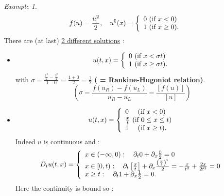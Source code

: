 \documentclass{report}
\theoremstyle{plain}
\theoremstyle{definition}
\theoremstyle{remark}
\newtheorem*{ex}{Example}
\begin{document}
    \begin{ex}
    \begin{equation*}
    	f(u) = \frac{u^2}{2}, \quad u^0(x) = \left\lbrace
    	\begin{array}[]{l}
    		 0 \text{ (if $x<0$)}\\
    		 1 \text{ (if $x \ge 0$)}.
    	\end{array}\right.
    \end{equation*}
    There are (at last) \underline{2 different solutions} :
    \begin{itemize}
        \item \begin{equation*}
    	u(t,x) = \left\lbrace
    	\begin{array}[]{l}
    		 0 \text{ (if $x<\sigma t$)}\\
    		 1 \text{ (if $x \ge \sigma t$)}.
    	\end{array}\right.
        \end{equation*}
        with $\sigma = \frac{\frac{1^2}{2}-\frac{0^2}{2}}{1-0} = \frac{1+0}{2} = \frac{1}{2}$ \textbf{( = Rankine-Hugoniot relation)}.\\
        $$\left( \sigma = \frac{f(u_R) - f(u_L)}{u_R - u_L} = \frac{\left[f(u)\right]}{\left[u\right]}\right)$$
        \item \begin{equation*}
    	u(t,x) = \left\lbrace
    	\begin{array}[]{l}
    		 0 \quad \text{ (if $x<0$)}\\
    		 \frac{x}{t} \text{ (if $0 \le x \le t$)}\\
    		 1 \quad \text{ (if $x \ge t$)}.
    	\end{array}\right.
        \end{equation*}
        Indeed $u$ is continuous and :
        \begin{equation*}
    	D_t u(t,x) = \left\lbrace
    	\begin{array}[]{l}
    		 x\in(-\infty,0) : \quad \partial_t 0 + \partial_x \frac{0}{2} = 0\\
    		 x \in [0,t) : \quad \partial_t \left[\frac{x}{t}\right] + \partial_x\frac{\left(\frac{x}{t}\right)^2}{2} = -\frac{x}{t^2} + \frac{2x}{2t^2} = 0\\
    		 x \ge t : \quad \partial_t 1 + \partial_x \frac{1}{2} = 0.
    	\end{array}\right.
        \end{equation*}
        Here the continuity is bound so :

\end{itemize}
\end{ex}
\end{document}
